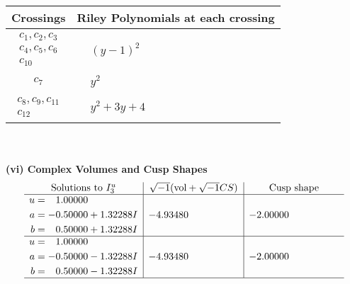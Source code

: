 \documentclass[1p]{elsarticle_modified}
\theoremstyle{definition}
\newcommand{\I}{\sqrt{-1}}
\begin{document}
\begin{tabular}{m{50pt}|m{274pt}}
Crossings & \hspace{64pt}Riley Polynomials at each crossing \\
\hline $$\begin{aligned}c_{1},c_{2},c_{3}\\c_{4},c_{5},c_{6}\\c_{10}\end{aligned}$$&$\begin{aligned}
&(y-1)^2
\end{aligned}$\\
\hline $$\begin{aligned}c_{7}\end{aligned}$$&$\begin{aligned}
&y^2
\end{aligned}$\\
\hline $$\begin{aligned}c_{8},c_{9},c_{11}\\c_{12}\end{aligned}$$&$\begin{aligned}
&y^2+3 y+4
\end{aligned}$\\
\hline
\end{tabular}\\~\\
\newpage\flushleft \textbf{(vi) Complex Volumes and Cusp Shapes}
$$\begin{array}{c|c|c}  
\text{Solutions to }I^u_{3}& \I (\text{vol} + \sqrt{-1}CS) & \text{Cusp shape}\\
 \hline 
\begin{aligned}
u &= \phantom{-}1.00000\phantom{ +0.000000I} \\
a &= -0.50000 + 1.32288 I \\
b &= \phantom{-}0.50000 + 1.32288 I\end{aligned}
 & -4.93480\phantom{ +0.000000I} & -2.00000\phantom{ +0.000000I} \\ \hline\begin{aligned}
u &= \phantom{-}1.00000\phantom{ +0.000000I} \\
a &= -0.50000 - 1.32288 I \\
b &= \phantom{-}0.50000 - 1.32288 I\end{aligned}
 & -4.93480\phantom{ +0.000000I} & -2.00000\phantom{ +0.000000I}\\
 \hline 
 \end{array}$$\newpage\newpage\renewcommand{\arraystretch}{1}
\end{document}
